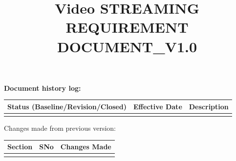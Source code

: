 \documentclass[10pt,a4paper]{article} %
\title{Video STREAMING REQUIREMENT DOCUMENT\_V1.0}
\begin{document}
	\maketitle
	\thispagestyle{fancy}
	\newpage
	\tableofcontents
	\newpage
	\begin{center}
		\textbf{Document history log:}
	\end{center}
		
	\begin{center}
		
		\begin{tabular}{|p{5.5cm}|p{5cm}|p{5cm}|}
			\hline
			\textbf{Status (Baseline/Revision/Closed)} & \textbf{Effective Date} & \textbf{Description}\\
			\hline
			&   &  \\
			\hline
		\end{tabular}
	\end{center}
	
	
	\begin{center}
			
	\begin{table}[b]
		Changes made from previous version: \\
		\begin{tabular}{|p{5 cm}|p{5cm}|p{5cm}|}
			\hline
			\textbf{Section} & \textbf{SNo} & \textbf{Changes Made}\\
			\hline
			&  &  \\
			\hline
		\end{tabular}
	\end{table}
	\end{center}
	
	
\end{document}

